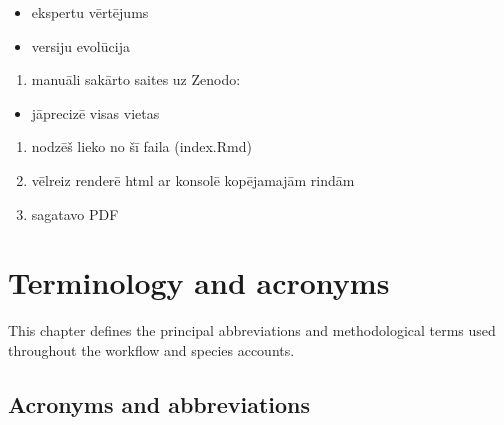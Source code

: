 \documentclass[
  openany]{book}
\providecommand{\tightlist}{%
  \setlength{\itemsep}{0pt}\setlength{\parskip}{0pt}}
\providecommand{\tightlist}{%
  \setlength{\itemsep}{0pt}%
  \setlength{\parskip}{0pt}%
}
\begin{document}
\begin{itemize}
\item
  ekspertu vērtējums
\item
  versiju evolūcija
\end{itemize}

\begin{enumerate}
\def\labelenumi{\arabic{enumi}.}
\setcounter{enumi}{4}
\tightlist
\item
  manuāli sakārto saites uz Zenodo:
\end{enumerate}

\begin{itemize}
\tightlist
\item
  jāprecizē visas vietas
\end{itemize}

\begin{enumerate}
\def\labelenumi{\arabic{enumi}.}
\setcounter{enumi}{5}
\item
  nodzēš lieko no šī faila (index.Rmd)
\item
  vēlreiz renderē html ar konsolē kopējamajām rindām
\item
  sagatavo PDF
\end{enumerate}

\chapter{Terminology and acronyms}\label{terminology-and-acronyms}

This chapter defines the principal abbreviations and methodological terms used throughout the workflow and species accounts.

\section*{Acronyms and abbreviations}\label{acronyms-and-abbreviations}
\end{document}
